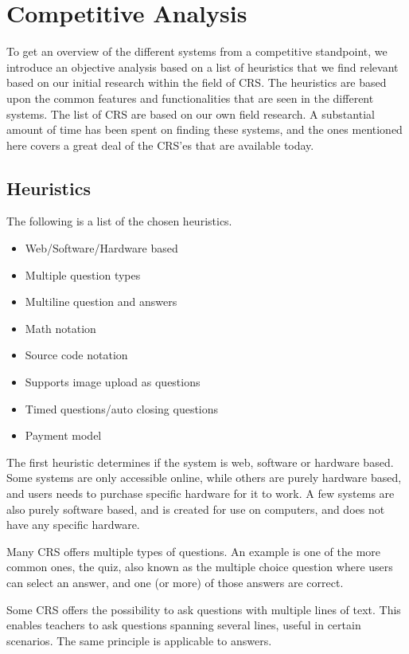 \section{Competitive Analysis}
To get an overview of the different systems from a competitive standpoint, we introduce an objective analysis based on a list of heuristics that we find relevant based on our initial research within the field of CRS. The heuristics are based upon the common features and functionalities that are seen in the different systems. The list of CRS are based on our own field research. A substantial amount of time has been spent on finding these systems, and the ones mentioned here covers a great deal of the CRS'es that are available today.

\subsection{Heuristics}

The following is a list of the chosen heuristics.

\begin{itemize}
    \item Web/Software/Hardware based
    \item Multiple question types
    \item Multiline question and answers
    \item Math notation
    \item Source code notation
    \item Supports image upload as questions
    \item Timed questions/auto closing questions
    \item Payment model
\end{itemize}

The first heuristic determines if the system is web, software or hardware based. Some systems are only accessible online, while others are purely hardware based, and users needs to purchase specific hardware for it to work. A few systems are also purely software based, and is created for use on computers, and does not have any specific hardware.

Many CRS offers multiple types of questions. An example is one of the more common ones, the quiz, also known as the multiple choice question where users can select an answer, and one (or more) of those answers are correct.

Some CRS offers the possibility to ask questions with multiple lines of text. This enables teachers to ask questions spanning several lines, useful in certain scenarios. The same principle is applicable to answers.

